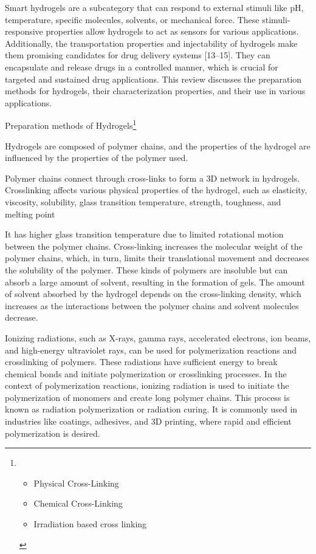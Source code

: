 \documentclass[../../main-notes.tex]{subfiles}
\begin{document}
Smart hydrogels are a subcategory that can respond to external stimuli like pH, temperature, specific molecules, solvents, or mechanical force. 
These stimuli-responsive properties allow hydrogels to act as sensors for various applications. 
Additionally, the transportation properties and injectability of hydrogels make them promising candidates for drug delivery systems [13–15]. 
They can encapsulate and release drugs in a controlled manner, which is crucial for targeted and sustained drug applications. 
This review discusses the preparation methods for hydrogels, their characterization properties, and their use in various applications.



Preparation methods of Hydrogels\footnote{
    \begin{itemize}
        \item Physical Cross-Linking
        \item Chemical Cross-Linking
        \item Irradiation based cross linking
    \end{itemize}
}

Hydrogels are composed of polymer chains, and the properties of the hydrogel are influenced by the properties of the polymer used.

Polymer chains connect through cross-links to form a 3D network in hydrogels. 
Crosslinking affects various physical properties of the hydrogel, such as elasticity, viscosity, solubility, glass transition temperature, strength, toughness, and melting point


It has higher glass transition temperature due to limited rotational motion between the polymer chains. 
Cross-linking increases the molecular weight of the polymer chains, which, in turn, limits their translational movement and decreases the solubility of the polymer.
These kinds of polymers are insoluble but can absorb a large amount of solvent, resulting in the formation of gels.
The amount of solvent absorbed by the hydrogel depends on the cross-linking density, which increases as the interactions between the polymer chains and solvent molecules decrease.



Ionizing radiations, such as X-rays, gamma rays, accelerated electrons, ion beams, and high-energy ultraviolet rays, can be used for polymerization reactions and crosslinking of polymers. 
These radiations have sufficient energy to break chemical bonds and initiate polymerization or crosslinking processes. 
In the context of polymerization reactions, ionizing radiation is used to initiate the polymerization of monomers and create long polymer chains. 
This process is known as radiation polymerization or radiation curing. It is commonly used in industries like coatings, adhesives, and 3D printing, where rapid and efficient polymerization is desired. 
\end{document}
